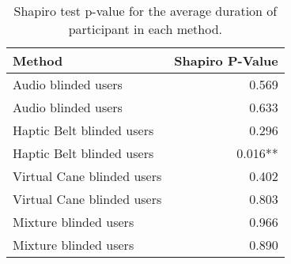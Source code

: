 
\begin{table}[!htb]
\centering
\caption{Shapiro test p-value for the average duration of participant in each method.}
\label{tab:shapiro_duration_avg}
\begin{tabular}{lr}
\toprule
                    Method & Shapiro P-Value \\
\midrule
       Audio blinded users &           0.569 \\
       Audio blinded users &           0.633 \\
 Haptic Belt blinded users &           0.296 \\
 Haptic Belt blinded users &         0.016** \\
Virtual Cane blinded users &           0.402 \\
Virtual Cane blinded users &           0.803 \\
     Mixture blinded users &           0.966 \\
     Mixture blinded users &           0.890 \\
\bottomrule
\end{tabular}
\end{table}


